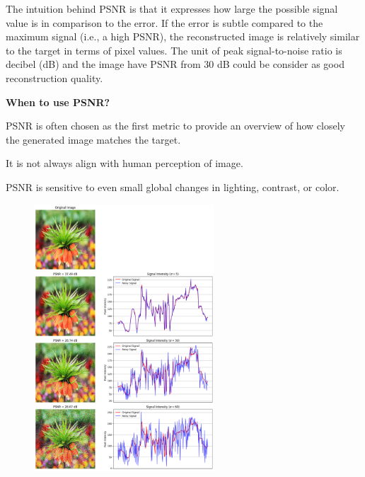 \vspace{-10pt}

The intuition behind PSNR is that it expresses how large the possible signal value is in comparison to the error. 
If the error is subtle compared to the maximum signal (i.e., a high PSNR), the reconstructed image is relatively similar to
the target in terms of pixel values. The unit of peak signal-to-noise ratio is decibel (dB) and the image have PSNR from 30 dB
could be consider as good reconstruction quality.



\textbf{When to use PSNR?}

PSNR is often chosen as the first metric to provide an overview of how closely the generated image matches the target.

{
\item It is not always align with human perception of image.
\item PSNR is sensitive to even small global changes in lighting, contrast, or color.
}

\clearpage

\thispagestyle{customstyle}


\begin{figure}[ht!]
    \centering
    \includegraphics[width=0.6\textwidth]{figures/PSNR_plot.png}
    \label{PSNR plot}
\end{figure}


